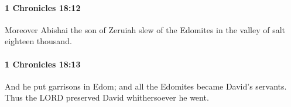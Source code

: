 		\paragraph{1 Chronicles 18:12} %
			\label{1CHRONICLES-18-12}

			Moreover Abishai the son of Zeruiah slew of the Edomites in the valley of salt eighteen thousand.


		\paragraph{1 Chronicles 18:13} %
			\label{1CHRONICLES-18-13}

			And he put garrisons in Edom; and all the Edomites became David’s servants. Thus the LORD preserved David whithersoever he went.


